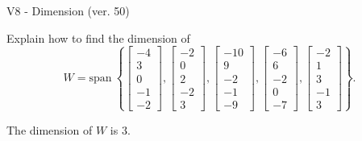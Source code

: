 \begin{exercise}
  \begin{exerciseTitle}V8 - Dimension (ver. 50)\end{exerciseTitle}
  \begin{exerciseStatement}
    Explain how to find the dimension of 
\[W=\mathrm{span}\ \left\{\left[\begin{array}{r}
-4 \\
3 \\
0 \\
-1 \\
-2
\end{array}\right] , \left[\begin{array}{r}
-2 \\
0 \\
2 \\
-2 \\
3
\end{array}\right] , \left[\begin{array}{r}
-10 \\
9 \\
-2 \\
-1 \\
-9
\end{array}\right] , \left[\begin{array}{r}
-6 \\
6 \\
-2 \\
0 \\
-7
\end{array}\right] , \left[\begin{array}{r}
-2 \\
1 \\
3 \\
-1 \\
3
\end{array}\right]\right\}.\]



  \end{exerciseStatement}
  \begin{exerciseAnswer}
   The dimension of \(W\) is  \(3\).
  


  \end{exerciseAnswer}
\end{exercise}